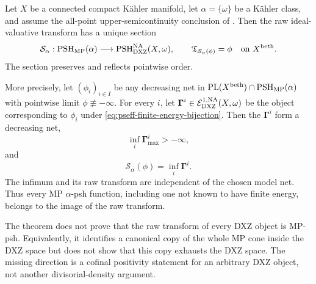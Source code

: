 \begin{theorem}\label{thm:p143-mp-section}
Let \(X\) be a connected compact K\"ahler manifold, let
\(\alpha=\{\omega\}\) be a K\"ahler class, and assume the all-point
upper-semicontinuity conclusion of
.
Then the raw ideal-valuative transform has a unique section
\[
 \mathcal S_\alpha:\operatorname{PSH}_{\mathrm{MP}}(\alpha)
        \longrightarrow\operatorname{PSH}^{\mathrm{NA}}_{\mathrm{DXZ}}(X,\omega),
 \qquad
 \mathfrak T_{\mathcal S_\alpha(\phi)}=\phi
 \quad\text{on }X^{\mathrm{beth}}.
\]
The section preserves and reflects pointwise order.

More precisely, let \((\phi_i)_{i\in I}\) be any decreasing net in
\(\operatorname{PL}(X^{\mathrm{beth}})\cap\operatorname{PSH}_{\mathrm{MP}}(\alpha)\) with pointwise limit
\(\phi\not\equiv-\infty\).  For every \(i\), let
\(\boldsymbol\Gamma^i\in
\mathcal E^{1,\mathrm{NA}}_{\mathrm{DXZ}}(X,\omega)\) be the object corresponding
to \(\phi_i\) under \eqref{eq:pseff-finite-energy-bijection}.  Then the
\(\boldsymbol\Gamma^i\) form a decreasing net,
\[
                 \inf_i\boldsymbol\Gamma^i_{\max}>-\infty,
\]
and
\[
                 \mathcal S_\alpha(\phi)
                 =\inf_i\boldsymbol\Gamma^i.
\]
The infimum and its raw transform are independent of the chosen model net.
Thus every MP \(\alpha\)-psh function, including one not known to have
finite energy, belongs to the image of the raw transform.
\end{theorem}

\begin{remark}\label{rem:p143-mp-section-scope}
The theorem does not prove that the raw transform of every DXZ object is
MP-psh.  Equivalently, it identifies a canonical copy of the whole MP cone
inside the DXZ space but does not show that this copy exhausts the DXZ
space.  The missing direction is a cofinal positivity statement for an
arbitrary DXZ object, not another divisorial-density argument.
\end{remark}
